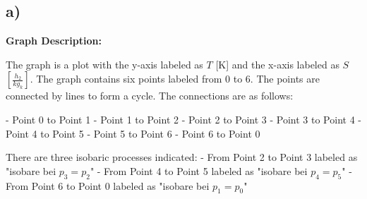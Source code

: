 

\subsection*{a)}

\begin{center}
\textbf{Graph Description:}

The graph is a plot with the y-axis labeled as \( T \) [K] and the x-axis labeled as \( S \) \(\left[ \frac{h_2}{kg_k} \right]\). The graph contains six points labeled from 0 to 6. The points are connected by lines to form a cycle. The connections are as follows:

- Point 0 to Point 1
- Point 1 to Point 2
- Point 2 to Point 3
- Point 3 to Point 4
- Point 4 to Point 5
- Point 5 to Point 6
- Point 6 to Point 0

There are three isobaric processes indicated:
- From Point 2 to Point 3 labeled as "isobare bei \( p_3 = p_2 \)"
- From Point 4 to Point 5 labeled as "isobare bei \( p_4 = p_5 \)"
- From Point 6 to Point 0 labeled as "isobare bei \( p_1 = p_0 \)"
\end{center}
